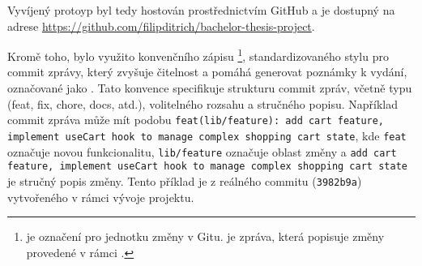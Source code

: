 Vyvíjený protoyp byl tedy hostován prostřednictvím GitHub a je dostupný na adrese \url{https://github.com/filipditrich/bachelor-thesis-project}.

Kromě toho, bylo využito konvenčního zápisu \footnote{ je označení pro jednotku změny v Gitu.  je zpráva, která popisuje změny provedené v rámci .}, standardizovaného stylu pro commit zprávy, který zvyšuje čitelnost a pomáhá generovat poznámky k vydání, označované jako .
Tato konvence specifikuje strukturu commit zpráv, včetně typu (feat, fix, chore, docs, atd.), volitelného rozsahu a stručného popisu.
Například commit zpráva může mít podobu \texttt{feat(lib/feature): add cart feature, implement useCart hook to manage complex shopping cart state}, kde \texttt{feat} označuje novou funkcionalitu, \texttt{lib/feature} označuje oblast změny a \texttt{add cart feature, implement useCart hook to manage complex shopping cart state} je stručný popis změny.
Tento příklad je z reálného commitu (\texttt{3982b9a}) vytvořeného v rámci vývoje projektu.
